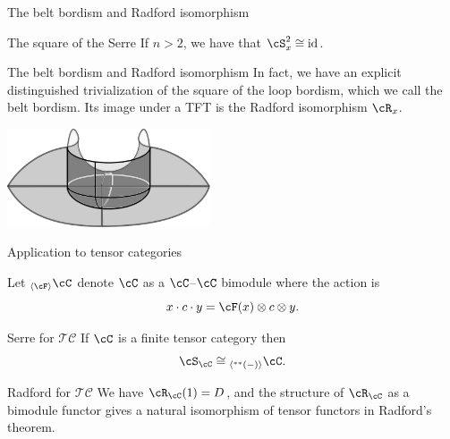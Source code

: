\documentclass[beamer]{beamer}
\newcommand{\ldd}[1]
{{}^{**}{#1}}
\begin{document}
\begin{frame}{The belt bordism and Radford isomorphism}
\begin{block}{The square of the Serre}
If $n > 2$, we have that $\cS_x^2 \cong \mathrm{id}$.
\end{block}

\begin{block}{The belt bordism and Radford isomorphism}
In fact, we have an explicit distinguished trivialization of the square of the loop bordism, which we call the belt bordism.  Its image under a TFT is the Radford isomorphism $\cR_x$.

\begin{center}
\includegraphics[width=60mm]{../cobordism.png}
\end{center}

\end{block}
\end{frame}

\begin{frame}{Application to tensor categories}
\begin{defn}
Let ${}_{\langle\cF \rangle} \cC$ denote $\cC$ as a $\cC$--$\cC$ bimodule where the action is $$x \cdot c \cdot y = \cF(x) \otimes c \otimes y.$$  
\end{defn}

\begin{block}{Serre for $\mathcal{TC}$}
If $\cC$ is a finite tensor category then $$\cS_\cC \cong {}_{\langle\ldd{(-)}\rangle} \cC.$$
\end{block}

\begin{block}{Radford for $\mathcal{TC}$}
We have $\cR_\cC(1) = D$, and the structure of $\cR_\cC$ as a bimodule functor gives a natural isomorphism of tensor functors in Radford's theorem.
\end{block}
\end{frame}
\end{document}
